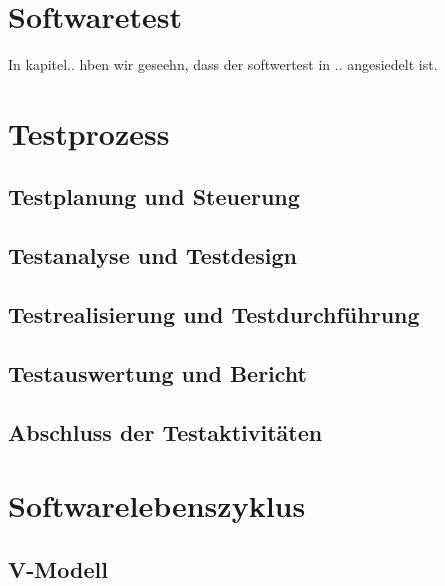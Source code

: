 \section{Softwaretest}
\label{sec:softwaretest}
In kapitel.. hben wir geseehn, dass der softwertest in .. angesiedelt ist.



\section{Testprozess}
\label{sec:testprozess}



\subsection{Testplanung und Steuerung}
\label{subsec:testplanung_und_steuerung}


\subsection{Testanalyse und Testdesign}
\label{subsec:testanalyse_und_design}


\subsection{Testrealisierung und Testdurchführung}
\label{subsec:testrealisierung_und_durchführung}

\subsection{Testauswertung und Bericht}
\label{subsec:testauswertung_und_bericht}


\subsection{Abschluss der Testaktivitäten}
\label{subsec:abschluss_der_testaktivitäten}



\section{Softwarelebenszyklus}
\label{sec:softwarelebenszyklus}



\subsection{V-Modell}
\label{subsec:vmodell}

